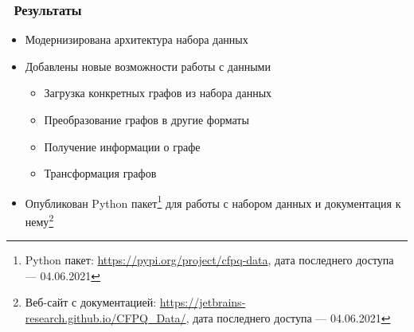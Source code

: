 \begin{frame}
	\transwipe[direction=90]
	\frametitle{\faCheckSquareO\ Результаты}
	\begin{itemize}
		\item[\checkmark] Модернизирована архитектура набора данных
		\item[\checkmark] Добавлены новые возможности работы с данными
		\begin{itemize}
            \item[\checkmark] Загрузка конкретных графов из набора данных
            \item[\checkmark] Преобразование графов в другие форматы
            \item[\checkmark] Получение информации о графе
            \item[\checkmark] Трансформация графов
        \end{itemize}
		\item[\checkmark] Опубликован Python пакет\footnote{Python пакет: \url{https://pypi.org/project/cfpq-data}, дата последнего доступа --- 04.06.2021} для работы с набором данных и документация к нему\footnote{Веб-сайт с документацией: \url{https://jetbrains-research.github.io/CFPQ_Data/}, дата последнего доступа --- 04.06.2021}
	\end{itemize}
\end{frame}